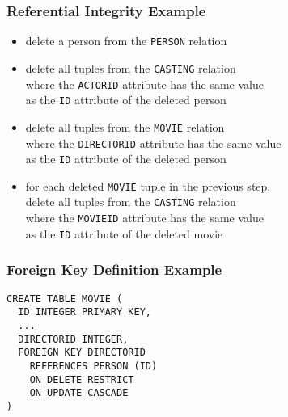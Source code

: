\documentclass[dvipsnames]{beamer}
\theoremstyle{plain}
\begin{document}
\begin{frame}[fragile]
  \frametitle{Referential Integrity Example}

  \begin{example}
    \begin{itemize}
      \item delete a person from the \texttt{PERSON} relation

      \pause
      \item delete all tuples from the \texttt{CASTING} relation\\
        where the \texttt{ACTORID} attribute has the same value\\
        as the \texttt{ID} attribute of the deleted person

      \pause
      \item delete all tuples from the \texttt{MOVIE} relation\\
        where the \texttt{DIRECTORID} attribute has the same value\\
        as the \texttt{ID} attribute of the deleted person

      \pause
      \item for each deleted \texttt{MOVIE} tuple in the previous step,\\
        delete all tuples from the \texttt{CASTING} relation\\
        where the \texttt{MOVIEID} attribute has the same value\\
        as the \texttt{ID} attribute of the deleted movie

    \end{itemize}
  \end{example}
\end{frame}

\begin{frame}[fragile]
  \frametitle{Foreign Key Definition Example}

  \begin{example}
    \begin{lstlisting}
CREATE TABLE MOVIE (
  ID INTEGER PRIMARY KEY,
  ...
  DIRECTORID INTEGER,
  FOREIGN KEY DIRECTORID
    REFERENCES PERSON (ID)
    ON DELETE RESTRICT
    ON UPDATE CASCADE
)
    \end{lstlisting}
  \end{example}
\end{frame}
\end{document}
